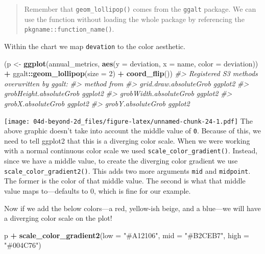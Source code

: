 \documentclass[
]{book}
\newenvironment{Shaded}{\begin{snugshade}}{\end{snugshade}}
\newcommand{\CommentTok}[1]{\textcolor[rgb]{0.56,0.35,0.01}{\textit{#1}}}
\newcommand{\DataTypeTok}[1]{\textcolor[rgb]{0.13,0.29,0.53}{#1}}
\newcommand{\DecValTok}[1]{\textcolor[rgb]{0.00,0.00,0.81}{#1}}
\newcommand{\KeywordTok}[1]{\textcolor[rgb]{0.13,0.29,0.53}{\textbf{#1}}}
\newcommand{\NormalTok}[1]{#1}
\newcommand{\OperatorTok}[1]{\textcolor[rgb]{0.81,0.36,0.00}{\textbf{#1}}}
\newcommand{\StringTok}[1]{\textcolor[rgb]{0.31,0.60,0.02}{#1}}
\begin{document}
\begin{quote}
Remember that \texttt{geom\_lollipop()} comes from the \texttt{ggalt} package. We can use the function without loading the whole package by referencing the \texttt{pkgname::function\_name()}.
\end{quote}

Within the chart we map \texttt{devation} to the color aesthetic.

\begin{Shaded}
\begin{Highlighting}[]
\NormalTok{(p \textless{}{-}}\StringTok{ }\KeywordTok{ggplot}\NormalTok{(annual\_metrics, }\KeywordTok{aes}\NormalTok{(}\DataTypeTok{y =}\NormalTok{ deviation, }\DataTypeTok{x =}\NormalTok{ name, }\DataTypeTok{color =}\NormalTok{ deviation)) }\OperatorTok{+}\StringTok{ }
\StringTok{  }\NormalTok{ggalt}\OperatorTok{::}\KeywordTok{geom\_lollipop}\NormalTok{(}\DataTypeTok{size =} \DecValTok{2}\NormalTok{) }\OperatorTok{+}\StringTok{ }
\StringTok{  }\KeywordTok{coord\_flip}\NormalTok{())}
\CommentTok{\#\textgreater{} Registered S3 methods overwritten by \textquotesingle{}ggalt\textquotesingle{}:}
\CommentTok{\#\textgreater{}   method                  from   }
\CommentTok{\#\textgreater{}   grid.draw.absoluteGrob  ggplot2}
\CommentTok{\#\textgreater{}   grobHeight.absoluteGrob ggplot2}
\CommentTok{\#\textgreater{}   grobWidth.absoluteGrob  ggplot2}
\CommentTok{\#\textgreater{}   grobX.absoluteGrob      ggplot2}
\CommentTok{\#\textgreater{}   grobY.absoluteGrob      ggplot2}
\end{Highlighting}
\end{Shaded}

\texttt{[image: 04d-beyond-2d\_files/figure-latex/unnamed-chunk-24-1.pdf]}
The above graphic doesn't take into account the middle value of \texttt{0}. Because of this, we need to tell ggplot2 that this is a diverging color scale. When we were working with a normal continuous color scale we used \texttt{scale\_color\_gradient()}. Instead, since we have a middle value, to create the diverging color gradient we use \texttt{scale\_color\_gradient2()}. This adds two more arguments \texttt{mid} and \texttt{midpoint}. The former is the color of that middle value. The second is what that middle value maps to---defaults to 0, which is fine for our example.

Now if we add the below colors---a red, yellow-ish beige, and a blue---we will have a diverging color scale on the plot!

\begin{Shaded}
\begin{Highlighting}[]
\NormalTok{p }\OperatorTok{+}\StringTok{ }
\StringTok{  }\KeywordTok{scale\_color\_gradient2}\NormalTok{(}\DataTypeTok{low =} \StringTok{"\#A12106"}\NormalTok{, }\DataTypeTok{mid =} \StringTok{"\#B2CEB7"}\NormalTok{, }\DataTypeTok{high =} \StringTok{"\#004C76"}\NormalTok{)}
\end{Highlighting}
\end{Shaded}
\end{document}
